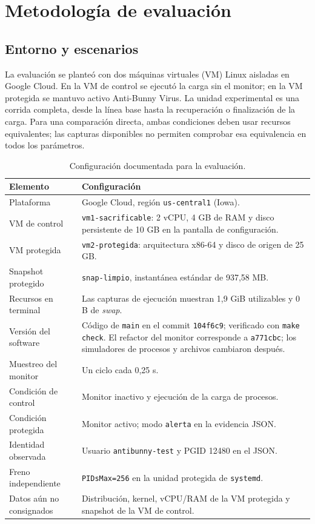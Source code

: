 \chapter{Metodología de evaluación}

\section{Entorno y escenarios}

La evaluación se planteó con dos máquinas
virtuales (VM) Linux aisladas en Google Cloud. En la VM de control se ejecutó
la carga sin el monitor; en la VM protegida se mantuvo activo Anti-Bunny Virus.
La unidad experimental es una corrida completa, desde la línea base hasta la
recuperación o finalización de la carga. Para una comparación directa, ambas
condiciones deben usar recursos equivalentes; las capturas disponibles no
permiten comprobar esa equivalencia en todos los parámetros.

\begin{table}[H]
  \centering
  \caption{Configuración documentada para la evaluación.}
  \label{tab:entorno-evaluacion}
  \small
  \begin{tabular}{p{}p{}}
    \toprule
    Elemento & Configuración \\
    \midrule
    Plataforma & Google Cloud, región \texttt{us-central1} (Iowa). \\
    VM de control & \texttt{vm1-sacrificable}: 2 vCPU, 4 GB de RAM y disco persistente de 10 GB en la pantalla de configuración. \\
    VM protegida & \texttt{vm2-protegida}: arquitectura x86-64 y disco de origen de 25 GB. \\
    Snapshot protegido & \texttt{snap-limpio}, instantánea estándar de 937,58 MB. \\
    Recursos en terminal & Las capturas de ejecución muestran 1,9 GiB utilizables y 0 B de \emph{swap}. \\
    Versión del software & Código de \texttt{main} en el commit \texttt{104f6c9}; verificado con \texttt{make check}. El refactor del monitor corresponde a \texttt{a771cbc}; los simuladores de procesos y archivos cambiaron después. \\
    Muestreo del monitor & Un ciclo cada 0,25 s. \\
    Condición de control & Monitor inactivo y ejecución de la carga de procesos. \\
    Condición protegida & Monitor activo; modo \texttt{alerta} en la evidencia JSON. \\
    Identidad observada & Usuario \texttt{antibunny-test} y PGID 12480 en el JSON. \\
    Freno independiente & \texttt{PIDsMax=256} en la unidad protegida de \texttt{systemd}. \\
    Datos aún no consignados & Distribución, kernel, vCPU/RAM de la VM protegida y snapshot de la VM de control. \\
    \bottomrule
  \end{tabular}
\end{table}

